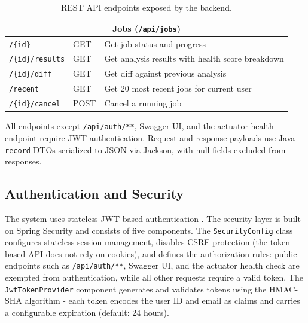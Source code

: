 \begin{table}[htbp]
\begin{tabular}{|l|l|p{6cm}|}
        \hline\hline
        \multicolumn{3}{|c|}{\textbf{Jobs} (\texttt{/api/jobs})} \\
        \hline
        \texttt{/\{id\}}           & GET             & Get job status and progress                      \\
        \hline
        \texttt{/\{id\}/results}   & GET             & Get analysis results with health score breakdown \\
        \hline
        \texttt{/\{id\}/diff}      & GET             & Get diff against previous analysis               \\
        \hline
        \texttt{/recent}           & GET             & Get 20 most recent jobs for current user         \\
        \hline
        \texttt{/\{id\}/cancel}    & POST            & Cancel a running job                             \\
        \hline
    \end{tabular}
    \caption{REST API endpoints exposed by the backend.}
    \label{tab:api-endpoints}
\end{table}

All endpoints except \texttt{/api/auth/**}, Swagger UI, and the actuator health endpoint require JWT authentication. Request and response payloads use Java \texttt{record} DTOs serialized to JSON via Jackson, with null fields excluded from responses.

\subsection{Authentication and Security}
\label{subsec:auth-security}

 \par The system uses stateless JWT based authentication \cite{RFC7519}. The security layer is built on Spring Security and consists of five components. The \texttt{SecurityConfig} class configures stateless session management, disables CSRF protection (the token-based API does not rely on cookies), and defines the authorization rules: public endpoints such as \texttt{/api/auth/**}, Swagger UI, and the actuator health check are exempted from authentication, while all other requests require a valid token. The \texttt{JwtTokenProvider} component generates and validates tokens using the HMAC-SHA algorithm \cite{RFC4634} - each token encodes the user ID and email as claims and carries a configurable expiration (default: 24 hours).

